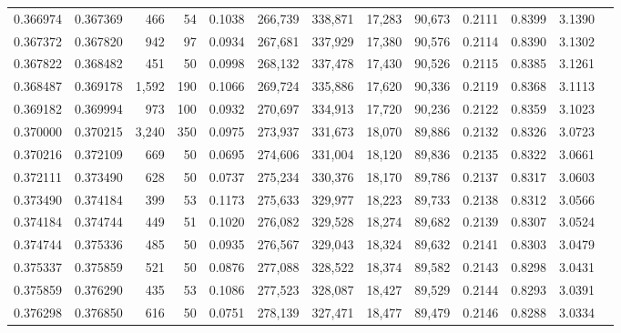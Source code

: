 \begin{tabular}{rrrrrrrrrrrrr}
0.366974 & 0.367369 &   466 &  54 &                                     0.1038 & 266,739 & 338,871 &  17,283 &  90,673 & 0.2111 & 0.8399 & 3.1390 \\
0.367372 & 0.367820 &   942 &  97 &                                     0.0934 & 267,681 & 337,929 &  17,380 &  90,576 & 0.2114 & 0.8390 & 3.1302 \\
0.367822 & 0.368482 &   451 &  50 &                                     0.0998 & 268,132 & 337,478 &  17,430 &  90,526 & 0.2115 & 0.8385 & 3.1261 \\
0.368487 & 0.369178 & 1,592 & 190 &                                     0.1066 & 269,724 & 335,886 &  17,620 &  90,336 & 0.2119 & 0.8368 & 3.1113 \\
0.369182 & 0.369994 &   973 & 100 &                                     0.0932 & 270,697 & 334,913 &  17,720 &  90,236 & 0.2122 & 0.8359 & 3.1023 \\
0.370000 & 0.370215 & 3,240 & 350 &                                     0.0975 & 273,937 & 331,673 &  18,070 &  89,886 & 0.2132 & 0.8326 & 3.0723 \\
0.370216 & 0.372109 &   669 &  50 &                                     0.0695 & 274,606 & 331,004 &  18,120 &  89,836 & 0.2135 & 0.8322 & 3.0661 \\
0.372111 & 0.373490 &   628 &  50 &                                     0.0737 & 275,234 & 330,376 &  18,170 &  89,786 & 0.2137 & 0.8317 & 3.0603 \\
0.373490 & 0.374184 &   399 &  53 &                                     0.1173 & 275,633 & 329,977 &  18,223 &  89,733 & 0.2138 & 0.8312 & 3.0566 \\
0.374184 & 0.374744 &   449 &  51 &                                     0.1020 & 276,082 & 329,528 &  18,274 &  89,682 & 0.2139 & 0.8307 & 3.0524 \\
0.374744 & 0.375336 &   485 &  50 &                                     0.0935 & 276,567 & 329,043 &  18,324 &  89,632 & 0.2141 & 0.8303 & 3.0479 \\
0.375337 & 0.375859 &   521 &  50 &                                     0.0876 & 277,088 & 328,522 &  18,374 &  89,582 & 0.2143 & 0.8298 & 3.0431 \\
0.375859 & 0.376290 &   435 &  53 &                                     0.1086 & 277,523 & 328,087 &  18,427 &  89,529 & 0.2144 & 0.8293 & 3.0391 \\
0.376298 & 0.376850 &   616 &  50 &                                     0.0751 & 278,139 & 327,471 &  18,477 &  89,479 & 0.2146 & 0.8288 & 3.0334 \\

\end{tabular}
